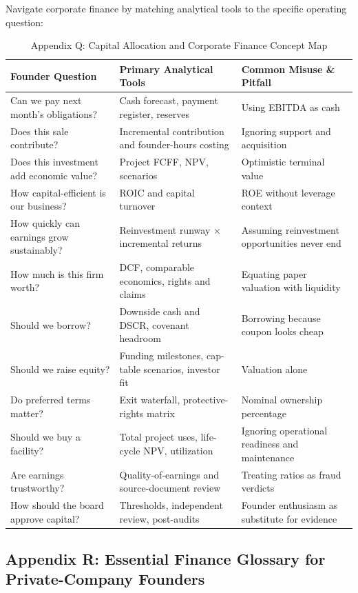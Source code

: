 Navigate corporate finance by matching analytical tools to the specific operating question:

\begin{table}[t]
\centering
\small
\caption{Appendix Q: Capital Allocation and Corporate Finance Concept Map}
\label{tab:app_q_concept_map}
\begin{tabularx}{\textwidth}{p{4.2cm} p{5.0cm} X}
\toprule
\textbf{Founder Question} & \textbf{Primary Analytical Tools} & \textbf{Common Misuse \& Pitfall} \\
\midrule
Can we pay next month's obligations? & Cash forecast, payment register, reserves & Using EBITDA as cash \\
Does this sale contribute? & Incremental contribution and founder-hours costing & Ignoring support and acquisition \\
Does this investment add economic value? & Project FCFF, NPV, scenarios & Optimistic terminal value \\
How capital-efficient is our business? & ROIC and capital turnover & ROE without leverage context \\
How quickly can earnings grow sustainably? & Reinvestment runway $\times$ incremental returns & Assuming reinvestment opportunities never end \\
How much is this firm worth? & DCF, comparable economics, rights and claims & Equating paper valuation with liquidity \\
Should we borrow? & Downside cash and DSCR, covenant headroom & Borrowing because coupon looks cheap \\
Should we raise equity? & Funding milestones, cap-table scenarios, investor fit & Valuation alone \\
Do preferred terms matter? & Exit waterfall, protective-rights matrix & Nominal ownership percentage \\
Should we buy a facility? & Total project uses, life-cycle NPV, utilization & Ignoring operational readiness and maintenance \\
Are earnings trustworthy? & Quality-of-earnings and source-document review & Treating ratios as fraud verdicts \\
How should the board approve capital? & Thresholds, independent review, post-audits & Founder enthusiasm as substitute for evidence \\
\bottomrule
\end{tabularx}
\end{table}

\subsection{Appendix R: Essential Finance Glossary for Private-Company Founders}


